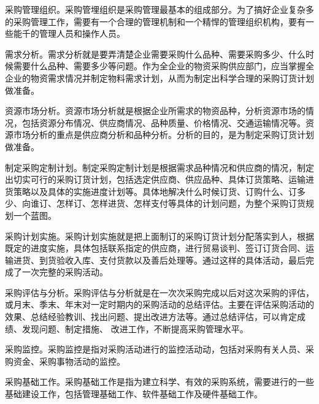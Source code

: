     \begin{enumerate.zh}

        \item 采购管理组织。采购管埋组织是采购管理最基本的组成部分。为了搞好企业复杂多的采购管理工作，需要有一个合理的管理机制和一个精悍的管理组织机构，要有一些能千的管理人员和操作人员。

        \item 需求分析。需求分析就是要弄清楚企业需要采购什么品种、需要采购多少、什么时候需要什么品种、需要多少等问题。作为全企业的物资采购供应部门，应当掌握全企业的物资需求情况并制定物料需求计划，从而为制定出科学合理的采购订货计划做准备。

        \item 资源市场分析。资源市场分析就是根据企业所需求的物资品种，分析资源市场的情况，包括资源分布情况、供应商情况、品种质量、价格情况、交通运输情况等。资源市场分析的重点是供应商分析和品种分析。分析的目的，是为制定采购订货计划做准备。

        \item 制定采购定制计划。制定采购定制计划是根据需求品种情况和供应商的情况，制定出切实可行的采购订货计划，包括选定供应商、供应品种、具体订货策略、运输进货策略以及具体的实施进度计划等。具体地解决什么时候订货、订购什么、订多少、向谁订、怎样订、怎样进货、怎样支付等具体的计划问题，为整个采购订货规划一个蓝图。

        \item 采购计划实施。采购计划实施就是把上面制订的采购订货计划分配落实到人，根据既定的进度实施，具体包括联系指定的供应商，进行贸易谈判、签订订货合同、运输进货、到货验收入库、支付货款以及善后处理等。通过这样的具体活动，最后完成了一次完整的采购活动。

        \item 采购评估与分析。采购评估与分析就是在一次次采购完成以后对这次采购的评估，或月末、季末、年末对一定时期内的采购活动的总结评估。主要在评估采购活动的效果、总结经验教训、找出问题、提出改进方法等。通过总结评估，可以肯定成绩、发现问题、制定措施、 改进工作，不断提高采购管理水平。

        \item 采购监控。采购监控是指对采购活动进行的监控活动动，包括对采购有关人员、采购资金、采购事物活动的监控。

        \item 采购基础工作。采购基础工作是指为建立科学、有效的采购系统，需要进行的一些基础建设工作，包括管理基础工作、软件基础工作及硬件基础工作。

    \end{enumerate.zh}

